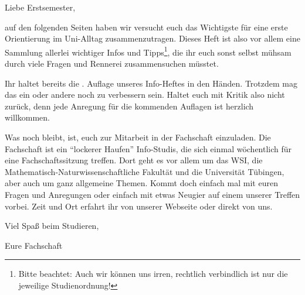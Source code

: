 Liebe Erstsemester,

auf den folgenden Seiten haben wir versucht euch das Wichtigste für eine
erste Orientierung im Uni-Alltag zusammenzutragen. Dieses Heft
ist also vor allem eine Sammlung allerlei wichtiger Infos und Tipps\footnote{
Bitte beachtet: Auch wir können uns irren, rechtlich verbindlich ist nur die
jeweilige Studienordnung!}, die ihr
euch sonst selbst mühsam durch viele Fragen und Rennerei %
zusammensuchen müsstet.



Ihr haltet bereits die \number\auflage. Auflage unseres Info-Heftes in den
Händen. Trotzdem mag das ein oder andere noch zu verbessern sein. Haltet
euch mit Kritik also nicht zurück, denn jede Anregung für die kommenden
Auf\/lagen ist herzlich willkommen.

Was noch bleibt, ist, euch zur Mitarbeit in der Fachschaft einzuladen.  Die
Fachschaft ist ein "`lockerer Haufen"' Info-Studis, die sich einmal wöchentlich
für eine Fachschaftssitzung treffen. Dort geht es vor allem um das WSI, die 
Mathematisch-Naturwissenschaftliche Fakultät und die Universität Tübingen, 
aber auch um ganz allgemeine Themen. Kommt doch einfach mal mit euren Fragen 
und Anregungen oder einfach mit etwas Neugier auf einem unserer Treffen vorbei.  
Zeit und Ort erfahrt ihr von unserer Webseite oder direkt von uns.

\bigskip

Viel Spaß beim Studieren,

Eure Fachschaft
\vfill
\bigskip

\eject
